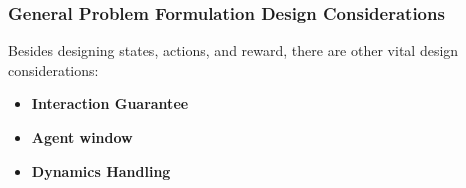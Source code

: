 \subsubsection{General Problem Formulation Design Considerations}
Besides designing states, actions, and reward, there are other vital design considerations: 
\begin{itemize}
    \item \textbf{Interaction Guarantee} 
    \label{meth_SA_int_guarantee}
    
    \item \textbf{Agent window }
    
    \item \textbf{Dynamics Handling} 
    
\end{itemize} 


